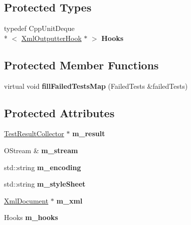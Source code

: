 \subsection*{Protected Types}
\begin{DoxyCompactItemize}
\item 
\hypertarget{class_xml_outputter_a721fa60bda8d779457ae8e429be21d74}{typedef Cpp\-Unit\-Deque\\*
$<$ \hyperlink{class_xml_outputter_hook}{Xml\-Outputter\-Hook} $\ast$ $>$ {\bfseries Hooks}}\label{class_xml_outputter_a721fa60bda8d779457ae8e429be21d74}

\end{DoxyCompactItemize}
\subsection*{Protected Member Functions}
\begin{DoxyCompactItemize}
\item 
\hypertarget{class_xml_outputter_a063afe5aaec2936d53ba58c45b5bdb54}{virtual void {\bfseries fill\-Failed\-Tests\-Map} (Failed\-Tests \&failed\-Tests)}\label{class_xml_outputter_a063afe5aaec2936d53ba58c45b5bdb54}

\end{DoxyCompactItemize}
\subsection*{Protected Attributes}
\begin{DoxyCompactItemize}
\item 
\hypertarget{class_xml_outputter_a982002691814b46b0fe8ca79a74d8895}{\hyperlink{class_test_result_collector}{Test\-Result\-Collector} $\ast$ {\bfseries m\-\_\-result}}\label{class_xml_outputter_a982002691814b46b0fe8ca79a74d8895}

\item 
\hypertarget{class_xml_outputter_a6f7eb773760301d381ba7f3ca5729bca}{O\-Stream \& {\bfseries m\-\_\-stream}}\label{class_xml_outputter_a6f7eb773760301d381ba7f3ca5729bca}

\item 
\hypertarget{class_xml_outputter_a193e314a66971eec760045fc20e5a2d1}{std\-::string {\bfseries m\-\_\-encoding}}\label{class_xml_outputter_a193e314a66971eec760045fc20e5a2d1}

\item 
\hypertarget{class_xml_outputter_a83e00800a42c2a62127e335f28b58230}{std\-::string {\bfseries m\-\_\-style\-Sheet}}\label{class_xml_outputter_a83e00800a42c2a62127e335f28b58230}

\item 
\hypertarget{class_xml_outputter_a7c789c60c2031edc2527e75e736612cb}{\hyperlink{class_xml_document}{Xml\-Document} $\ast$ {\bfseries m\-\_\-xml}}\label{class_xml_outputter_a7c789c60c2031edc2527e75e736612cb}

\item 
\hypertarget{class_xml_outputter_a54643e72aed488db22338cb878be2c81}{Hooks {\bfseries m\-\_\-hooks}}\label{class_xml_outputter_a54643e72aed488db22338cb878be2c81}

\end{DoxyCompactItemize}


